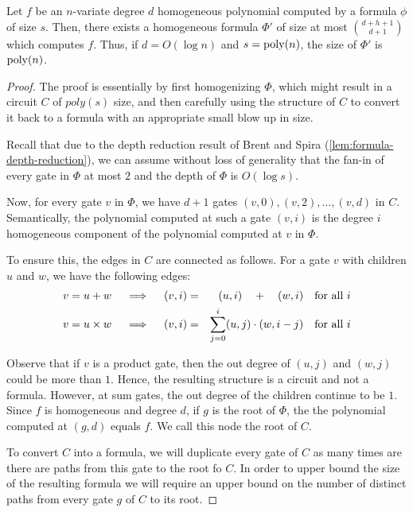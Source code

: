\begin{lemma}\label{lem:formula homogenization}
  Let $f$ be an $n$-variate degree $d$ homogeneous polynomial computed by a formula $\phi$ of size $s$.
Then, there exists a homogeneous formula $\Phi'$ of size at most ${d + h + 1\choose d+1}$ which computes $f$.
Thus, if $d = O(\log n)$ and $s = \operatorname{poly}(n)$, the size of $\Phi'$ is $\operatorname{poly}(n)$.
\end{lemma}
\begin{proof}
  The proof is essentially by first homogenizing $\Phi$, which might result in a circuit $C$ of $poly(s)$ size, and then carefully using the structure of $C$ to convert it back to a formula with an appropriate small blow up in size.

  Recall that due to the depth reduction result of Brent and Spira (\autoref{lem:formula-depth-reduction}), we can assume without loss of generality that the fan-in of every gate in $\Phi$ at most $2$ and the depth of $\Phi$ is $O(\log s)$.

  Now, for every gate $v$ in $\Phi$, we have $d+1$ gates $(v, 0), (v, 2), \ldots, (v, d)$ in $C$.
Semantically, the polynomial computed at such a gate $(v, i)$ is the degree $i$ homogeneous component of the polynomial computed at $v$ in $\Phi$.

To ensure this, the edges in $C$ are connected as follows.
For a gate $v$ with children $u$ and $w$, we have the following edges:
\begin{eqnarray*}
\text{$v = u + w$}\quad\implies\quad (v, i) &=& (u, i) \quad + \quad (w,i)\quad\text{for all $i$}\\
\text{$v = u \times w$}\quad\implies\quad (v, i) &=& \sum_{j=0}^i (u,j)\cdot (w, {i-j}) \quad\text{for all $i$}
\end{eqnarray*}
 
Observe that if $v$ is a product gate, then the out degree of $(u, j)$ and $(w, j)$ could be more than $1$.
Hence, the resulting structure is a circuit and not a formula.
However, at sum gates, the out degree of the children continue to be $1$.
Since $f$ is homogeneous and degree $d$, if $g$ is the root of $\Phi$, the the polynomial computed at $(g,d)$ equals $f$.
We call this node the root of $C$.

To convert $C$ into a formula, we will duplicate every gate of $C$ as many times are there are paths from this gate to the root fo $C$.
In order to upper bound the size of the resulting formula we will require an upper bound on the number of distinct paths from every gate $g$ of $C$ to its root.


\end{proof}

